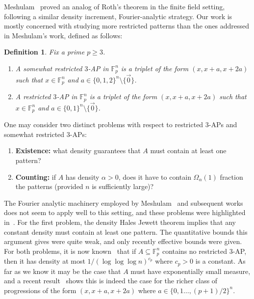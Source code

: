 \documentclass[10pt,a4paper]{amsart}
\newtheorem{definition}[thm]{Definition}
\renewcommand\geq{\geqslant}
\begin{document}
Meshulam~\cite{Meshulam}  proved an analog of Roth's theorem in the finite field setting, following a similar density increment, Fourier-analytic strategy.
Our work is mostly concerned with studying more restricted patterns than the ones addressed in Meshulam's work, defined as follows:
\begin{definition}
    Fix a prime $p\geq 3$. 
    \begin{enumerate}
        \item A somewhat restricted $3$-AP in $\mathbb{F}_p^n$ is a triplet of the form $(x,x+a,x+2a)$ such that $x\in\mathbb{F}_p^n$ and 
    $a\in\{0,1,2\}^n\setminus\{\vec{0}\}$.
    \item A restricted $3$-AP in $\mathbb{F}_p^n$ is a triplet of the form $(x,x+a,x+2a)$ such that $x\in\mathbb{F}_p^n$ and 
    $a\in\{0,1\}^n\setminus\{\vec{0}\}$.
    \end{enumerate}
    
\end{definition}
One may consider two distinct problems with respect to restricted $3$-APs and somewhat restricted $3$-APs: 
\begin{enumerate}
    \item {\bf Existence:} what density guarantees that $A$ must contain at least one pattern?
    \item {\bf Counting:} if $A$ has density $\alpha>0$, does it have to contain $\Omega_{\alpha}(1)$ fraction the patterns (provided $n$ is sufficiently large)?
\end{enumerate}
The Fourier analytic machinery employed by Meshulam~\cite{Meshulam} and subsequent works does not seem to apply well to this setting, and these problems were highlighted in~\cite{Green,Mos}. For the first problem, the density Hales Jewett theorem implies that any constant density must contain at least one pattern. The quantitative bounds this argument gives were quite weak, and only recently effective bounds were given. For both problems, it is now known~\cite{BKM3AP,BKLMDHJ} that if  $A\subseteq\mathbb{F}_p^n$ contains no restricted $3$-AP, then it has density at most $1/(\log\log\log n)^{c_p}$ where $c_p>0$ is a constant. As far as we know it may be the case that $A$ must have exponentially small measure, and a recent result~\cite{conlon2026note} shows this is indeed the case for the richer class of progressions of the form $(x,x+a,x+2a)$ where $a\in \{0,1\ldots, (p+1)/2\}^n$.
\end{document}
